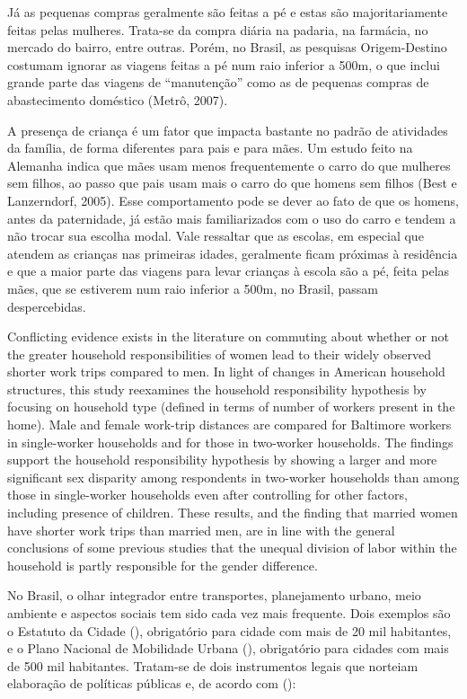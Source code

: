 Já as pequenas compras geralmente são feitas a pé e estas são majoritariamente feitas pelas mulheres. Trata-se da compra diária na padaria, na farmácia, no mercado do bairro, entre outras. Porém, no Brasil, as pesquisas Origem-Destino costumam ignorar as viagens feitas a pé num raio inferior a 500m, o que inclui grande parte das viagens de “manutenção” como as de pequenas compras de abastecimento doméstico (Metrô, 2007).

A presença de criança é um fator que impacta bastante no padrão de atividades da família, de forma diferentes para pais e para mães. Um estudo feito na Alemanha indica que mães usam menos frequentemente o carro do que mulheres sem filhos, ao passo que pais usam mais o carro do que homens sem filhos (Best e Lanzerndorf, 2005). Esse comportamento pode se dever ao fato de que os homens, antes da paternidade, já estão mais familiarizados com o uso do carro e tendem a não trocar sua escolha modal. Vale ressaltar que as escolas, em especial que atendem as crianças nas primeiras idades, geralmente ficam próximas à residência e que a maior parte das viagens para levar crianças à escola são a pé, feita pelas mães, que se estiverem num raio inferior a 500m, no Brasil, passam despercebidas.

Conflicting evidence exists in the literature on commuting about whether or not the greater household responsibilities of women lead to their widely observed shorter work trips compared to men. In light of changes in American household structures, this study reexamines the household responsibility hypothesis by focusing on household type (defined in terms of number of workers present in the home). Male and female work-trip distances are compared for Baltimore workers in single-worker households and for those in two-worker households. The findings support the household responsibility hypothesis by showing a larger and more significant sex disparity among respondents in two-worker households than among those in single-worker households even after controlling for other factors, including presence of children. These results, and the finding that married women have shorter work trips than married men, are in line with the general conclusions of some previous studies that the unequal division of labor within the household is partly responsible for the gender difference. \cite{IBIPO1992}


No Brasil, o olhar integrador entre transportes, planejamento urbano, meio ambiente e aspectos sociais tem sido cada vez mais frequente. Dois exemplos são o Estatuto da Cidade (\citeyear{ESTATUTOCIDADE}), obrigatório para cidade com mais de 20 mil habitantes, e o Plano Nacional de Mobilidade Urbana (\citeyear{PNMU}), obrigatório para cidades com mais de 500 mil habitantes. Tratam-se de dois instrumentos legais que norteiam elaboração de políticas públicas e, de acordo com (\citeyear{IEMA2010}):

